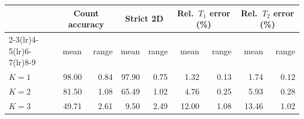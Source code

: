 \begin{tabular}{lrrrrrrrr}
\toprule
& \multicolumn{2}{c}{Count accuracy} & \multicolumn{2}{c}{Strict 2D} & \multicolumn{2}{c}{Rel.\ $T_1$ error (\%)} & \multicolumn{2}{c}{Rel.\ $T_2$ error (\%)} \\
\cmidrule(lr){2-3}\cmidrule(lr){4-5}\cmidrule(lr){6-7}\cmidrule(lr){8-9}
& mean & range & mean & range & mean & range & mean & range \\
\midrule
$K=1$ & 98.00 & 0.84 & 97.90 & 0.75 & 1.32 & 0.13 & 1.74 & 0.12 \\
$K=2$ & 81.50 & 1.08 & 65.49 & 1.02 & 4.76 & 0.25 & 5.93 & 0.28 \\
$K=3$ & 49.71 & 2.61 & 9.50 & 2.49 & 12.00 & 1.08 & 13.46 & 1.02 \\
\bottomrule
\end{tabular}
